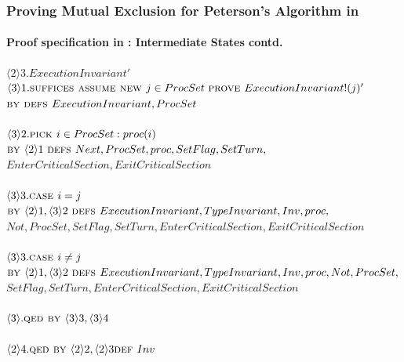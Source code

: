 \documentclass[xcolor=dvipsnames]{beamer}
\begin{document}
\begin{frame}
	\frametitle{Proving Mutual Exclusion for Peterson's Algorithm in \tla}
	\framesubtitle{Proof specification in \tla : Intermediate States contd.}
	\fontsize{8}{10}\selectfont
	
	\hspace*{0cm}$\langle2\rangle3. ExecutionInvariant'$\\
	\hspace*{0.4cm}$\langle3\rangle1. \textsc{suffices } \textsc{assume } \textsc{new } j \in ProcSet\  \textsc{prove } ExecutionInvariant!(j)'$\\
	\hspace*{0.4cm}$\textsc{by } \textsc{defs } ExecutionInvariant,ProcSet$\\~\\
	\hspace*{0.4cm}$\langle3\rangle2. \textsc{pick } i \in ProcSet : proc(i) $\\
	\hspace*{0.8cm}$\textsc{by } \langle2\rangle1 \ \textsc{defs } Next,ProcSet,proc, SetFlag, SetTurn,$\\
	\hspace*{0.8cm}$EnterCriticalSection, ExitCriticalSection$\\~\\
	\hspace*{0.4cm}$\langle3\rangle3. \textsc{case } i =j $\\
	\hspace*{0.8cm}$\textsc{by } \langle2\rangle1 , \langle3\rangle2\  \textsc{defs } ExecutionInvariant, TypeInvariant, Inv, proc,$\\
	\hspace*{0.8cm}$Not,ProcSet, SetFlag, SetTurn, EnterCriticalSection, ExitCriticalSection$\\~\\
	\hspace*{0.4cm}$\langle3\rangle3. \textsc{case } i \neq j $\\
	\hspace*{0.8cm}$\textsc{by } \langle2\rangle1 , \langle3\rangle2\  \textsc{defs } ExecutionInvariant, TypeInvariant, Inv, proc, Not,ProcSet,$\\
	\hspace*{0.8cm}$SetFlag, SetTurn, EnterCriticalSection, ExitCriticalSection$\\~\\
	\hspace*{0.4cm}$\langle3\rangle. \textsc{qed } \textsc{by } \langle3\rangle3 , \langle3\rangle4 $\\~\\
	\hspace*{0cm}$\langle2\rangle4. \textsc{qed } \textsc{by } \langle2\rangle2 , \langle2\rangle3 \textsc{def } Inv $\\~\\
\end{frame}
\end{document}
